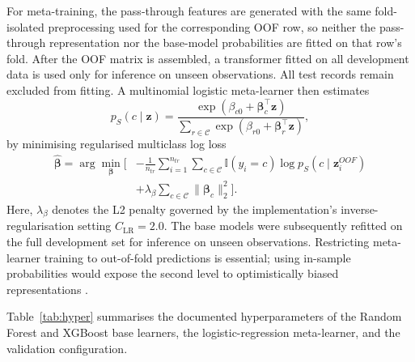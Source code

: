 \documentclass[a4paper,fleqn]{cas-dc}
\begin{document}
For meta-training, the pass-through features are generated with the same fold-isolated preprocessing used for the corresponding OOF row, so neither the pass-through representation nor the base-model probabilities are fitted on that row's fold. After the OOF matrix is assembled, a transformer fitted on all development data is used only for inference on unseen observations. All test records remain excluded from fitting. A multinomial logistic meta-learner then estimates
\\
\begin{equation}
p_{S}(c\mid\mathbf{z})=
\frac{\exp(\beta_{c0}+\boldsymbol{\beta}_c^{\top}\mathbf{z})}
{\sum_{r\in\mathcal{C}}\exp(\beta_{r0}+\boldsymbol{\beta}_r^{\top}\mathbf{z})},
\label{eq:meta}
\end{equation}
by minimising regularised multiclass log loss
\begin{equation}
\begin{aligned}
\widehat{\boldsymbol{\beta}}=\arg\min_{\boldsymbol{\beta}}\Biggl[&
-\frac{1}{n_{tr}}\sum_{i=1}^{n_{tr}}\sum_{c\in\mathcal{C}}
\mathbb{I}(y_i=c)\log p_S(c\mid\mathbf{z}^{OOF}_i)\\
&+\lambda_{\beta}\sum_{c\in\mathcal{C}}\lVert\boldsymbol{\beta}_c\rVert_2^2\Biggr].
\end{aligned}
\label{eq:metaloss}
\end{equation}
Here, $\lambda_{\beta}$ denotes the L2 penalty governed by the implementation's inverse-regularisation setting $C_{\mathrm{LR}}=2.0$. The base models were subsequently refitted on the full development set for inference on unseen observations. Restricting meta-learner training to out-of-fold predictions is essential; using in-sample probabilities would expose the second level to optimistically biased representations \cite{kapoor2023,alabi2023}.

Table~\ref{tab:hyper} summarises the documented hyperparameters of the Random Forest and XGBoost base learners, the logistic-regression meta-learner, and the validation configuration.
\end{document}
